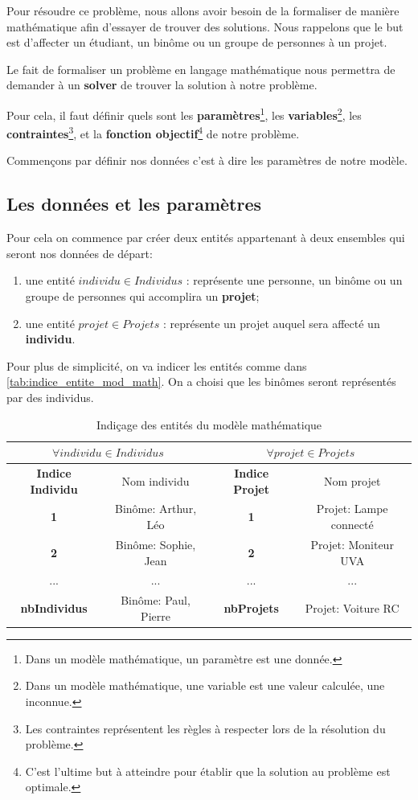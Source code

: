 \documentclass[final,poster]{polytech/polytech}
\begin{document}
Pour résoudre ce problème, nous allons avoir besoin de la formaliser de manière mathématique afin d'essayer de trouver des solutions.
Nous rappelons que le but est d'affecter un étudiant, un binôme ou un groupe de personnes à un projet.

Le fait de formaliser un problème en langage mathématique nous permettra de demander à un \textbf{solver} de trouver la solution à notre problème.

Pour cela, il faut définir quels sont les \textbf{paramètres}\footnote{Dans un modèle mathématique, un paramètre est une donnée.}, les \textbf{ variables}\footnote{Dans un modèle mathématique, une variable est une valeur calculée, une inconnue.}, les \textbf{contraintes}\footnote{Les contraintes représentent les règles à respecter lors de la résolution du problème.}, et la \textbf{fonction objectif}\footnote{C'est l'ultime but à atteindre pour établir que la solution au problème est optimale.} de notre problème.

Commençons par définir nos données c'est à dire les paramètres de notre modèle.

\subsection{Les données et les paramètres\label{sec:donnees_params}}

Pour cela on commence par créer deux entités appartenant à deux ensembles qui seront nos données de départ:
\begin{enumerate}
\item une entité $individu \in Individus$ : représente une personne, un binôme ou un groupe de personnes qui accomplira un \textbf{projet};
\item une entité  $projet \in Projets$ : représente un projet auquel sera affecté un \textbf{individu}.
\end{enumerate}

Pour plus de simplicité, on va indicer les entités comme dans \autoref{tab:indice_entite_mod_math}. On a choisi que les binômes seront représentés par des individus.
\begin{table}
\caption{\label{tab:indice_entite_mod_math}Indiçage des entités du modèle mathématique}
\begin{tabular}{|c|c|c|c|}
\hline
\multicolumn{2}{|c|}{$\forall individu \in Individus$} & \multicolumn{2}{|c|}{$\forall projet \in Projets$} \\
\hline
\textbf{Indice Individu} & Nom individu &\textbf{ Indice Projet} & Nom projet \\
\hline
\textbf{1} & Binôme: Arthur, Léo & \textbf{1} & Projet: Lampe connecté \\
\hline
\textbf{2} & Binôme: Sophie, Jean & \textbf{2} & Projet: Moniteur UVA \\
\hline
... & ... & ... & ... \\
\hline
\textbf{nbIndividus} & Binôme: Paul, Pierre &\textbf{ nbProjets} & Projet: Voiture RC \\
\hline
\end{tabular}
\end{table}
\end{document}
